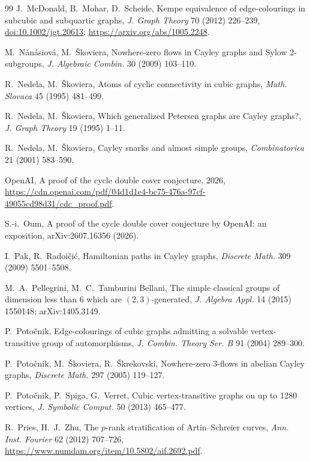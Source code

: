 \documentclass[11pt,a4paper]{article}
\theoremstyle{definition}
\theoremstyle{remark}
\begin{document}
\begin{thebibliography}{99}
 J.~McDonald, B.~Mohar, D.~Scheide, Kempe equivalence of edge-colourings in subcubic and subquartic graphs, \emph{J. Graph Theory} 70 (2012) 226--239, \href{https://doi.org/10.1002/jgt.20613}{doi:10.1002/jgt.20613}; \url{https://arxiv.org/abs/1005.2248}.

 M.~N\'an\'asiov\'a, M.~\v{S}koviera, Nowhere-zero flows in Cayley graphs and Sylow 2-subgroups, \emph{J. Algebraic Combin.} 30 (2009) 103--110.

 R.~Nedela, M.~\v{S}koviera, Atoms of cyclic connectivity in cubic graphs, \emph{Math. Slovaca} 45 (1995) 481--499.

 R.~Nedela, M.~\v{S}koviera, Which generalized Petersen graphs are Cayley graphs?, \emph{J. Graph Theory} 19 (1995) 1--11.

 R.~Nedela, M.~\v{S}koviera, Cayley snarks and almost simple groups, \emph{Combinatorica} 21 (2001) 583--590.

 OpenAI, A proof of the cycle double cover conjecture, 2026, \url{https://cdn.openai.com/pdf/04d1d1e4-bc75-476a-97cf-49055cd98d31/cdc_proof.pdf}.

 S.-i.~Oum, A proof of the cycle double cover conjecture by OpenAI: an exposition, arXiv:2607.16356 (2026).

 I.~Pak, R.~Radoi\v{c}i\'c, Hamiltonian paths in Cayley graphs, \emph{Discrete Math.} 309 (2009) 5501--5508.

 M.~A.~Pellegrini, M.~C.~Tamburini Bellani, The simple classical groups of dimension less than 6 which are $(2,3)$-generated, \emph{J. Algebra Appl.} 14 (2015) 1550148; arXiv:1405.3149.

 P.~Poto\v{c}nik, Edge-colourings of cubic graphs admitting a solvable vertex-transitive group of automorphisms, \emph{J. Combin. Theory Ser. B} 91 (2004) 289--300.

 P.~Poto\v{c}nik, M.~\v{S}koviera, R.~\v{S}krekovski, Nowhere-zero 3-flows in abelian Cayley graphs, \emph{Discrete Math.} 297 (2005) 119--127.

 P.~Poto\v{c}nik, P.~Spiga, G.~Verret, Cubic vertex-transitive graphs on up to 1280 vertices, \emph{J. Symbolic Comput.} 50 (2013) 465--477.

 R.~Pries, H.~J.~Zhu, The $p$-rank stratification of Artin--Schreier curves, \emph{Ann. Inst. Fourier} 62 (2012) 707--726, \url{https://www.numdam.org/item/10.5802/aif.2692.pdf}.


\end{thebibliography}
\end{document}
